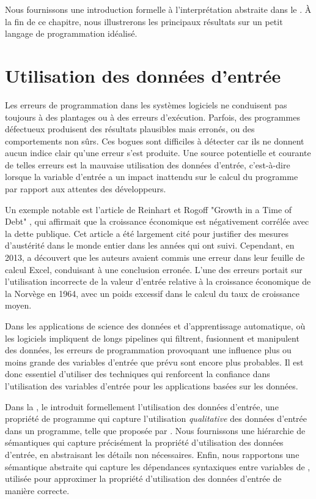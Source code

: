 {Nous fournissons une introduction formelle à l'interprétation abstraite dans le . À la fin de ce chapitre, nous illustrerons les principaux résultats sur un petit langage de programmation idéalisé.

\section*{Utilisation des données d'entrée}

Les erreurs de programmation dans les systèmes logiciels ne conduisent pas toujours à des plantages ou à des erreurs d'exécution. Parfois, des programmes défectueux produisent des résultats plausibles mais erronés, ou des comportements non sûrs. Ces bogues sont difficiles à détecter car ils ne donnent aucun indice clair qu'une erreur s'est produite. Une source potentielle et courante de telles erreurs est la mauvaise utilisation des données d'entrée, c'est-à-dire lorsque la variable d'entrée a un impact inattendu sur le calcul du programme par rapport aux attentes des développeurs.

Un exemple notable est l'article de Reinhart et Rogoff "Growth in a Time of Debt" , qui affirmait que la croissance économique est négativement corrélée avec la dette publique. Cet article a été largement cité pour justifier des mesures d'austérité dans le monde entier dans les années qui ont suivi. Cependant, en 2013,  a découvert que les auteurs avaient commis une erreur dans leur feuille de calcul Excel, conduisant à une conclusion erronée. L'une des erreurs portait sur l'utilisation incorrecte de la valeur d'entrée relative à la croissance économique de la Norvège en 1964, avec un poids excessif dans le calcul du taux de croissance moyen.

Dans les applications de science des données et d'apprentissage automatique, où les logiciels impliquent de longs pipelines qui filtrent, fusionnent et manipulent des données, les erreurs de programmation provoquant une influence plus ou moins grande des variables d'entrée que prévu sont encore plus probables. Il est donc essentiel d'utiliser des techniques qui renforcent la confiance dans l'utilisation des variables d'entrée pour les applications basées sur les données.

Dans la , le  introduit formellement l'utilisation des données d'entrée, une propriété de programme qui capture l'utilisation \emph{qualitative} des données d'entrée dans un programme, telle que proposée par \textcite{Urban2018}. Nous fournissons une hiérarchie de sémantiques qui capture précisément la propriété d'utilisation des données d'entrée, en abstraisant les détails non nécessaires. Enfin, nous rapportons une sémantique abstraite qui capture les dépendances syntaxiques entre variables de , utilisée pour approximer la propriété d'utilisation des données d'entrée de manière correcte.

}
